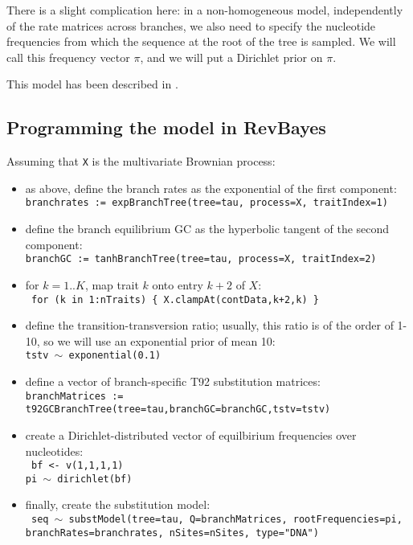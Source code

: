 \documentclass[usletter]{article}
\newcommand{\cmd}[1]{\texttt{#1}}
\begin{document}
There is a slight complication here: in a non-homogeneous model, independently of the rate matrices across branches, we also need to specify the nucleotide frequencies from which the sequence at the root of the tree is sampled. We will call this frequency vector $\pi$, and we will put a Dirichlet prior on $\pi$.

This model has been described in \cite{Lartillot:OUn7WLs9}.

\subsection*{Programming the model in RevBayes}

Assuming that \cmd{X} is the multivariate Brownian process:
\begin{itemize}
\item
as above, define the branch rates as the exponential of the first component:
\\
\cmd{branchrates := expBranchTree(tree=tau, process=X, traitIndex=1)}
\item
define the branch equilibrium GC as the hyperbolic tangent of the second component:
\\
\cmd{branchGC := tanhBranchTree(tree=tau, process=X, traitIndex=2)}
\item
for $k=1..K$, map trait $k$ onto entry $k+2$ of $X$:
\\
\cmd{
for (k in 1:nTraits)    \{
        X.clampAt(contData,k+2,k)
\}
}
\item
define the transition-transversion ratio; usually, this ratio is of the order of 1-10, so we will use an exponential prior of mean 10:
\\
\cmd{tstv $\sim$ exponential(0.1)}
\item
define a vector of branch-specific T92 substitution matrices:
\\
\cmd{branchMatrices := t92GCBranchTree(tree=tau,branchGC=branchGC,tstv=tstv)}
\item
create a Dirichlet-distributed vector of equilbirium frequencies over nucleotides:
\\
\cmd{
bf <- v(1,1,1,1)
\\
pi $\sim$ dirichlet(bf)
}
\item
finally, create the substitution model:
\\
\cmd{
seq $\sim$ substModel(tree=tau, Q=branchMatrices, rootFrequencies=pi,
\\
branchRates=branchrates, nSites=nSites, type="DNA")
}
\end{itemize}
\end{document}
